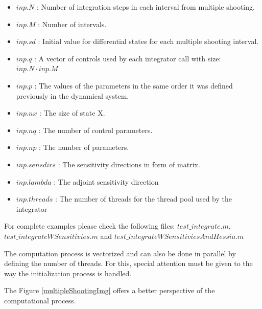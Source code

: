 \documentclass[12pt, letterpaper]{article}
\begin{document}
\begin{itemize}
	\item $inp.N$ :  Number of integration steps in each interval from multiple shooting. 
	\item $inp.M$ : Number of intervals. 

	\item $inp.sd$ : Initial value for differential states for each multiple shooting interval.
	
	\item $inp.q$ : A vector of controls used by each integrator call with size: $inp.N \cdot inp.M$

	\item $inp.p$ : The values of the parameters in the same order it was defined previously in the dynamical system.


	\item $inp.nx$ : The size of state X.
	\item $inp.nq$ : The number of control parameters.
	\item $inp.np$ : The number of parameters.
	\item $inp.sensdirs$ : The sensitivity directions in form of matrix.
	\item $inp.lambda$ : The adjoint sensitivity direction
	\item $inp.threads$ : The number of threads for the thread pool used by the integrator
\end{itemize}

For complete examples please check the following files: $test\_integrate.m$, $test\_integrateWSensitivies.m$ and
$test\_integrateWSensitiviesAndHessia.m$

The computation process is vectorized and can also be done in parallel by defining the number of threads. For this, special attention must be given to the way the initialization process is handled.

The Figure \ref{multipleShootingImg} offers a better perspective of the computational process.
\end{document}

